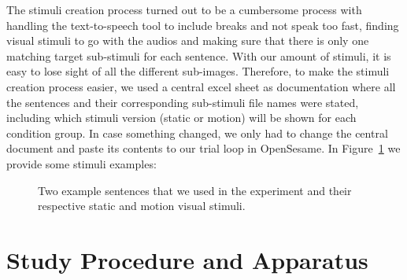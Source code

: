 \documentclass[
  12pt,
  letterpaper,
  DIV=11,
  numbers=noendperiod]{scrreprt}
\begin{document}
The stimuli creation process turned out to be a cumbersome process with
handling the text-to-speech tool to include breaks and not speak too
fast, finding visual stimuli to go with the audios and making sure that
there is only one matching target sub-stimuli for each sentence. With
our amount of stimuli, it is easy to lose sight of all the different
sub-images. Therefore, to make the stimuli creation process easier, we
used a central excel sheet as documentation where all the sentences and
their corresponding sub-stimuli file names were stated, including which
stimuli version (static or motion) will be shown for each condition
group. In case something changed, we only had to change the central
document and paste its contents to our trial loop in OpenSesame. In
Figure~\ref{fig-stimuli} we provide some stimuli examples:

\begin{figure}


\caption{\label{fig-stimuli}Two example sentences that we used in the
experiment and their respective static and motion visual stimuli.}

\end{figure}%

\section{Study Procedure and Apparatus}\label{sec-stdy-proc}
\end{document}
